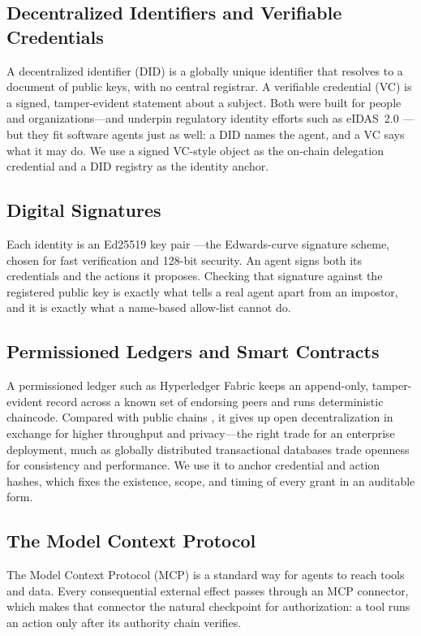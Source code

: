 \documentclass[conference]{IEEEtran}
\begin{document}
\subsection{Decentralized Identifiers and Verifiable Credentials}
A decentralized identifier (DID) \cite{w3c-did} is a globally unique identifier that resolves to a document of public keys, with no central registrar. A verifiable credential (VC) \cite{w3c-vc,sporny2019} is a signed, tamper-evident statement about a subject. Both were built for people and organizations---and underpin regulatory identity efforts such as eIDAS~2.0 \cite{eidas2024}---but they fit software agents just as well: a DID names the agent, and a VC says what it may do. We use a signed VC-style object as the on-chain delegation credential and a DID registry as the identity anchor.

\subsection{Digital Signatures}
Each identity is an Ed25519 key pair \cite{ed25519,rfc8032}---the Edwards-curve signature scheme, chosen for fast verification and 128-bit security. An agent signs both its credentials and the actions it proposes. Checking that signature against the registered public key is exactly what tells a real agent apart from an impostor, and it is exactly what a name-based allow-list cannot do.

\subsection{Permissioned Ledgers and Smart Contracts}
A permissioned ledger such as Hyperledger Fabric \cite{fabric2018} keeps an append-only, tamper-evident record across a known set of endorsing peers and runs deterministic chaincode. Compared with public chains \cite{nakamoto2008,wood2014}, it gives up open decentralization in exchange for higher throughput and privacy---the right trade for an enterprise deployment, much as globally distributed transactional databases \cite{spanner2013} trade openness for consistency and performance. We use it to anchor credential and action hashes, which fixes the existence, scope, and timing of every grant in an auditable form.

\subsection{The Model Context Protocol}
The Model Context Protocol (MCP) \cite{mcp2024} is a standard way for agents to reach tools and data. Every consequential external effect passes through an MCP connector, which makes that connector the natural checkpoint for authorization: a tool runs an action only after its authority chain verifies.
\end{document}
